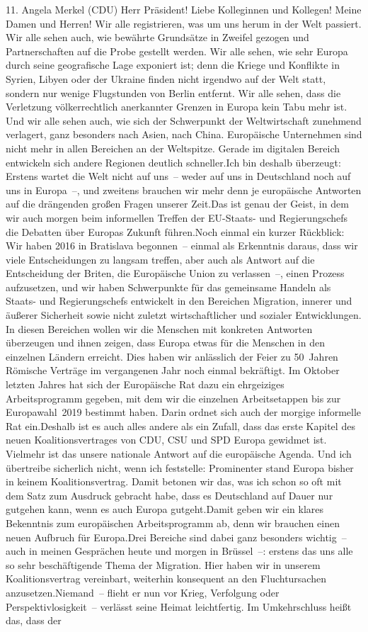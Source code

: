 \documentclass{article}
\begin{document}
	11. Angela Merkel (CDU) Herr Präsident! Liebe Kolleginnen und Kollegen! Meine Damen und Herren! Wir alle registrieren, was um uns herum in der Welt passiert. Wir alle sehen auch, wie bewährte Grundsätze in Zweifel gezogen und Partnerschaften auf die Probe gestellt werden. Wir alle sehen, wie sehr Europa durch seine geografische Lage exponiert ist; denn die Kriege und Konflikte in Syrien, Libyen oder der Ukraine finden nicht irgendwo auf der Welt statt, sondern nur wenige Flugstunden von Berlin entfernt. Wir alle sehen, dass die Verletzung völkerrechtlich anerkannter Grenzen in Europa kein Tabu mehr ist. Und wir alle sehen auch, wie sich der Schwerpunkt der Weltwirtschaft zunehmend verlagert, ganz besonders nach Asien, nach China. Europäische Unternehmen sind nicht mehr in allen Bereichen an der Weltspitze. Gerade im digitalen Bereich entwickeln sich andere Regionen deutlich schneller.Ich bin deshalb überzeugt: Erstens wartet die Welt nicht auf uns – weder auf uns in Deutschland noch auf uns in Europa –, und zweitens brauchen wir mehr denn je europäische Antworten auf die drängenden großen Fragen unserer Zeit.Das ist genau der Geist, in dem wir auch morgen beim informellen Treffen der EU-Staats- und Regierungschefs die Debatten über Europas Zukunft führen.Noch einmal ein kurzer Rückblick: Wir haben 2016 in Bratislava begonnen – einmal als Erkenntnis daraus, dass wir viele Entscheidungen zu langsam treffen, aber auch als Antwort auf die Entscheidung der Briten, die Europäische Union zu verlassen –, einen Prozess aufzusetzen, und wir haben Schwerpunkte für das gemeinsame Handeln als Staats- und Regierungschefs entwickelt in den Bereichen Migration, innerer und äußerer Sicherheit sowie nicht zuletzt wirtschaftlicher und sozialer Entwicklungen. In diesen Bereichen wollen wir die Menschen mit konkreten Antworten überzeugen und ihnen zeigen, dass Europa etwas für die Menschen in den einzelnen Ländern erreicht. Dies haben wir anlässlich der Feier zu 50 Jahren Römische Verträge im vergangenen Jahr noch einmal bekräftigt. Im Oktober letzten Jahres hat sich der Europäische Rat dazu ein ehrgeiziges Arbeitsprogramm gegeben, mit dem wir die einzelnen Arbeitsetappen bis zur Europawahl 2019 bestimmt haben. Darin ordnet sich auch der morgige informelle Rat ein.Deshalb ist es auch alles andere als ein Zufall, dass das erste Kapitel des neuen Koalitionsvertrages von CDU, CSU und SPD Europa gewidmet ist. Vielmehr ist das unsere nationale Antwort auf die europäische Agenda. Und ich übertreibe sicherlich nicht, wenn ich feststelle: Prominenter stand Europa bisher in keinem Koalitionsvertrag. Damit betonen wir das, was ich schon so oft mit dem Satz zum Ausdruck gebracht habe, dass es Deutschland auf Dauer nur gutgehen kann, wenn es auch Europa gutgeht.Damit geben wir ein klares Bekenntnis zum europäischen Arbeitsprogramm ab, denn wir brauchen einen neuen Aufbruch für Europa.Drei Bereiche sind dabei ganz besonders wichtig – auch in meinen Gesprächen heute und morgen in Brüssel –: erstens das uns alle so sehr beschäftigende Thema der Migration. Hier haben wir in unserem Koalitionsvertrag vereinbart, weiterhin konsequent an den Fluchtursachen anzusetzen.Niemand – flieht er nun vor Krieg, Verfolgung oder Perspektivlosigkeit – verlässt seine Heimat leichtfertig. Im Umkehrschluss heißt das, dass der 
\end{document}
